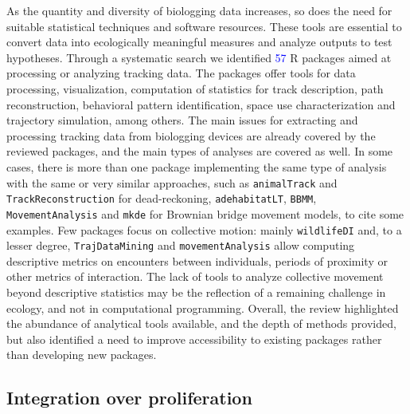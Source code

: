\documentclass[a4paper,12pt]{article}
\newcommand{\Rpkg}[1]{\texttt{#1}}
\begin{document}
{As the quantity and diversity of biologging data increases, so does the need for suitable statistical techniques and software resources. These tools are essential to convert data into ecologically meaningful measures and analyze outputs to test hypotheses. Through a systematic search we identified \textcolor{blue}{57} R packages aimed at processing or analyzing tracking data. The packages offer tools for data processing, visualization, computation of statistics for track description, path reconstruction, behavioral pattern identification, space use characterization and trajectory simulation, among others. 
The main issues for extracting and processing tracking data from biologging devices are already covered by the reviewed packages, and the main types of analyses are covered as well. %
In some cases, there is more than one package implementing the same type of analysis with the same or very similar approaches, such as \Rpkg{animalTrack} and \Rpkg{TrackReconstruction} for dead-reckoning, \Rpkg{adehabitatLT}, \Rpkg{BBMM}, \Rpkg{MovementAnalysis} and \Rpkg{mkde} for Brownian bridge movement models, to cite some examples. Few packages focus on collective motion: mainly \Rpkg{wildlifeDI} and, to a lesser degree, \Rpkg{TrajDataMining} and \Rpkg{movementAnalysis} allow computing descriptive metrics on encounters between individuals, periods of proximity or other metrics of interaction. The lack of tools to analyze collective movement beyond descriptive statistics may be the reflection of a remaining challenge in ecology, and not in computational programming. 
Overall, the review highlighted the abundance of analytical tools available, and the depth of methods provided, but also identified a need to improve accessibility to existing packages rather than developing new packages. %

\subsection*{Integration over proliferation}

}
\end{document}
